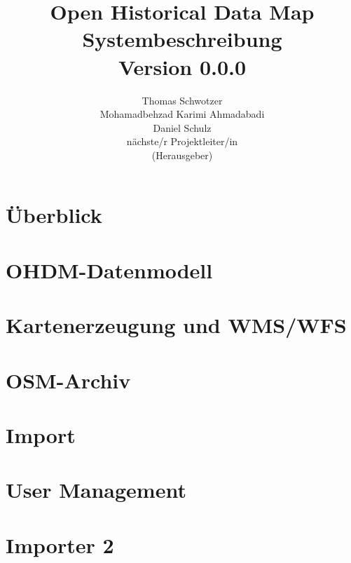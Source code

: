 \documentclass[german]{book}
\begin{document}
\title{Open Historical Data Map\\
Systembeschreibung \\
Version 0.0.0
}

\author{
Thomas Schwotzer \\
Mohamadbehzad Karimi Ahmadabadi\\
Daniel Schulz\\
nächste/r Projektleiter/in\\
(Herausgeber)
}

\maketitle

\tableofcontents

\chapter{Überblick}


\chapter{OHDM-Datenmodell}
\label{datenmodell}


\chapter{Kartenerzeugung und WMS/WFS}
\label{wms_wfs}


\chapter{OSM-Archiv}


\chapter{Import}


\chapter{User Management}


\chapter{Importer 2}

\end{document}

